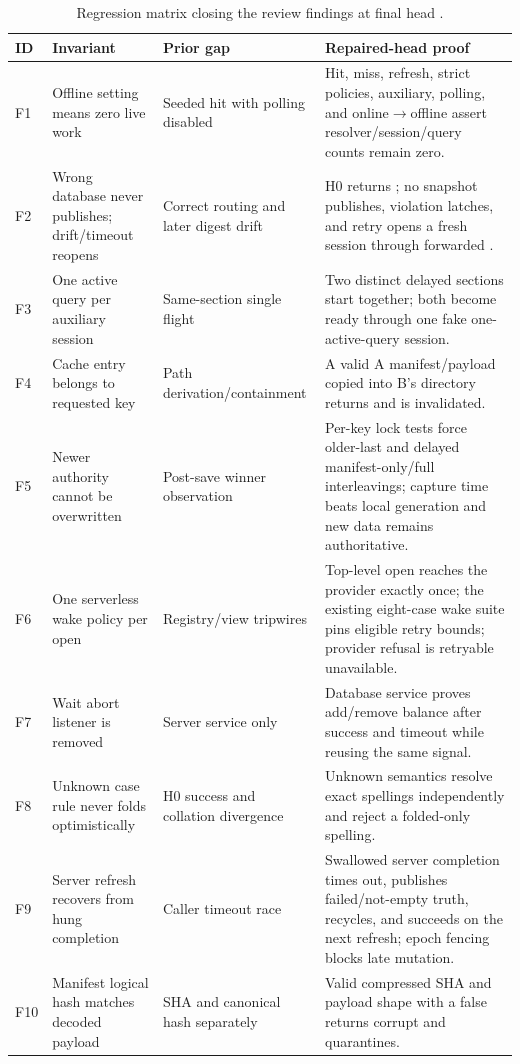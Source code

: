 \documentclass[11pt]{article}
\newcommand{\code}[1]{\texttt{\detokenize{#1}}}
\begin{document}
\begin{table}[H]
\centering
\small
\caption{Regression matrix closing the review findings at final head \code{69ca292f8}.}
\label{tab:regressions}
\begin{tabularx}{\textwidth}{@{}p{}p{}p{}X@{}}
\toprule
\textbf{ID} & \textbf{Invariant} & \textbf{Prior gap} & \textbf{Repaired-head proof}\\
\midrule
F1 & Offline setting means zero live work & Seeded hit with polling disabled & Hit, miss, refresh, strict policies, auxiliary, polling, and online$\rightarrow$offline assert resolver/session/query counts remain zero.\\
F2 & Wrong database never publishes; drift/timeout reopens & Correct routing and later digest drift & H0 returns \code{WrongDb}; no snapshot publishes, violation latches, and retry opens a fresh session through forwarded \code{recycle()}.\\
F3 & One active query per auxiliary session & Same-section single flight & Two distinct delayed sections start together; both become ready through one fake one-active-query session.\\
F4 & Cache entry belongs to requested key & Path derivation/containment & A valid A manifest/payload copied into B's directory returns \code{keyMismatch} and is invalidated.\\
F5 & Newer authority cannot be overwritten & Post-save winner observation & Per-key lock tests force older-last and delayed manifest-only/full interleavings; capture time beats local generation and new data remains authoritative.\\
F6 & One serverless wake policy per open & Registry/view tripwires & Top-level open reaches the provider exactly once; the existing eight-case wake suite pins eligible retry bounds; provider refusal is retryable unavailable.\\
F7 & Wait abort listener is removed & Server service only & Database service proves add/remove balance after success and timeout while reusing the same signal.\\
F8 & Unknown case rule never folds optimistically & H0 success and collation divergence & Unknown semantics resolve exact spellings independently and reject a folded-only spelling.\\
F9 & Server refresh recovers from hung completion & Caller timeout race & Swallowed server completion times out, publishes failed/not-empty truth, recycles, and succeeds on the next refresh; epoch fencing blocks late mutation.\\
F10 & Manifest logical hash matches decoded payload & SHA and canonical hash separately & Valid compressed SHA and payload shape with a false \code{contentHash} returns corrupt and quarantines.\\
\bottomrule
\end{tabularx}
\end{table}
\end{document}
